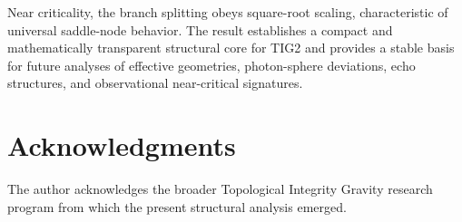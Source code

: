 \documentclass[12pt,a4paper]{article}
\begin{document}
Near criticality, the branch splitting obeys square-root scaling, characteristic of universal saddle-node behavior. The result establishes a compact and mathematically transparent structural core for TIG2 and provides a stable basis for future analyses of effective geometries, photon-sphere deviations, echo structures, and observational near-critical signatures.

\section*{Acknowledgments}

The author acknowledges the broader Topological Integrity Gravity research program from which the present structural analysis emerged.

\nocite{*}


\begingroup
\small

\endgroup
\end{document}

